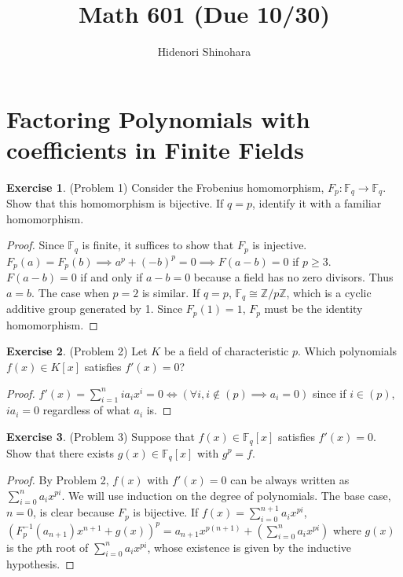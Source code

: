 \documentclass[12pt, psamsfonts]{amsart}
\theoremstyle{definition}
\newtheorem*{exer}{Exercise}
\theoremstyle{remark}
\numberwithin{equation}{section}
\begin{document}
\title{Math 601 (Due 10/30)}
\author{Hidenori Shinohara}
\maketitle

\tableofcontents

\section{Factoring Polynomials with coefficients in Finite Fields}

\begin{exer}{(Problem 1)}
  Consider the Frobenius homomorphism, $F_p: \mathbb{F}_q \rightarrow \mathbb{F}_q$.
  Show that this homomorphism is bijective.
  If $q = p$, identify it with a familiar homomorphism.
\end{exer}

\begin{proof}
  Since $\mathbb{F}_q$ is finite, it suffices to show that $F_p$ is injective.
  $F_p(a) = F_p(b) \implies a^p + (-b)^p = 0 \implies F(a - b) = 0$ if $p \geq 3$.
  $F(a - b) = 0$ if and only if $a - b = 0$ because a field has no zero divisors.
  Thus $a = b$.
  The case when $p = 2$ is similar.
  If $q = p$, $\mathbb{F}_q \cong \mathbb{Z}/p\mathbb{Z}$, which is a cyclic additive group generated by 1.
  Since $F_p(1) = 1$, $F_p$ must be the identity homomorphism.
\end{proof}

\begin{exer}{(Problem 2)}
  Let $K$ be a field of characteristic $p$.
  Which polynomials $f(x) \in K[x]$ satisfies $f'(x) = 0$?
\end{exer}

\begin{proof}
  $f'(x) = \sum_{i=1}^{n} ia_ix^i = 0 \iff (\forall i, i \notin (p) \implies a_i = 0)$ since if $i \in (p)$, $ia_i = 0$ regardless of what $a_i$ is.
\end{proof}

\begin{exer}{(Problem 3)}
  Suppose that $f(x) \in \mathbb{F}_q[x]$ satisfies $f'(x) = 0$.
  Show that there exists $g(x) \in \mathbb{F}_q[x]$ with $g^p = f$.
\end{exer}

\begin{proof}
  By Problem 2, $f(x)$ with $f'(x) = 0$ can be always written as $\sum_{i=0}^{n} a_ix^{pi}$.
  We will use induction on the degree of polynomials.
  The base case, $n = 0$, is clear because $F_p$ is bijective.
  If $f(x) = \sum_{i=0}^{n+1} a_ix^{pi}$, $(F_p^{-1}(a_{n+1})x^{n+1} + g(x))^p = a_{n+1}x^{p(n+1)} + (\sum_{i=0}^{n} a_ix^{pi})$ where $g(x)$ is the $p$th root of $\sum_{i=0}^{n} a_ix^{pi}$, whose existence is given by the inductive hypothesis.
\end{proof}
\end{document}
